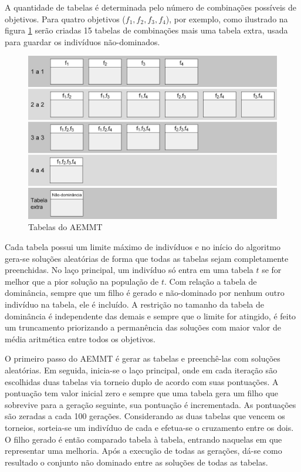 A quantidade de tabelas é determinada pelo número de combinações possíveis de objetivos. Para quatro objetivos ($f_1, f_2, f_3, f_4$), por exemplo, como ilustrado na figura \ref{fig_aemmt_tabelas} serão criadas 15 tabelas de combinações mais uma tabela extra, usada para guardar os indivíduos não-dominados.

\begin{figure}
	\label{fig_aemmt_tabelas}
	\caption{Tabelas do AEMMT}
	\centering
	\includegraphics[width=1\textwidth]{cap_otimizacao-multi/figs/aeemt-tabelas}
\end{figure}

Cada tabela possui um limite máximo de indivíduos e no início do algoritmo gera-se soluções aleatórias de forma que todas as tabelas sejam completamente preenchidas. No laço principal, um indivíduo só entra em uma tabela $t$ se for melhor que a pior solução na população de $t$. Com relação a tabela de dominância, sempre que um filho é gerado e não-dominado por nenhum outro indivíduo na tabela, ele é incluído. A restrição no tamanho da tabela de dominância é independente das demais e sempre que o limite for atingido, é feito um truncamento priorizando a permanência das soluções com maior valor de média aritmética entre todos os objetivos.

O primeiro passo do AEMMT é gerar as tabelas e preenchê-las com soluções aleatórias. Em seguida, inicia-se o laço principal, onde em cada iteração são escolhidas duas tabelas via torneio duplo de acordo com suas pontuações. A pontuação tem valor inicial zero e sempre que uma tabela gera um filho que sobrevive para a geração seguinte, sua pontuação é incrementada. As pontuações são zeradas a cada 100 gerações. Considerando as duas tabelas que vencem os torneios, sorteia-se um indivíduo de cada e efetua-se o cruzamento entre os dois. O filho gerado é então comparado tabela à tabela, entrando naquelas em que representar uma melhoria. Após a execução de todas as gerações, dá-se como resultado o conjunto não dominado entre as soluções de todas as tabelas.

